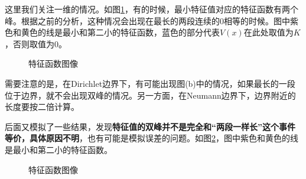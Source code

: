 \documentclass[12pt,a4paper]{article}
\begin{document}
这里我们关注一维的情况。如图\ref{f3}，有的时候，最小特征值对应的特征函数有两个峰。根据之前的分析，这种情况会出现在最长的两段连续的0相等的时候。图中紫色和黄色的线是最小和第二小的特征函数，蓝色的部分代表$V(x)$在此处取值为$K$，否则取值为$0$。
\begin{figure}[h]
\centering
{}
\caption{特征函数图像}
\label{f3}
\end{figure}
需要注意的是，在Dirichlet边界下，有可能出现图(b)中的情况，如果最长的一段位于边界，就不会出现双峰的情况。另一方面，在Neumann边界下，边界附近的长度要按二倍计算。

后面又模拟了一些结果，发现\textbf{特征值的双峰并不是完全和“两段一样长”这个事件等价，具体原因不明}，也有可能是模拟误差的问题。如图\ref{ff}，图中紫色和黄色的线是最小和第二小的特征函数。
\begin{figure}[h]
\centering
{}
\caption{特征函数图像}
\label{ff}
\end{figure}
\end{document}
